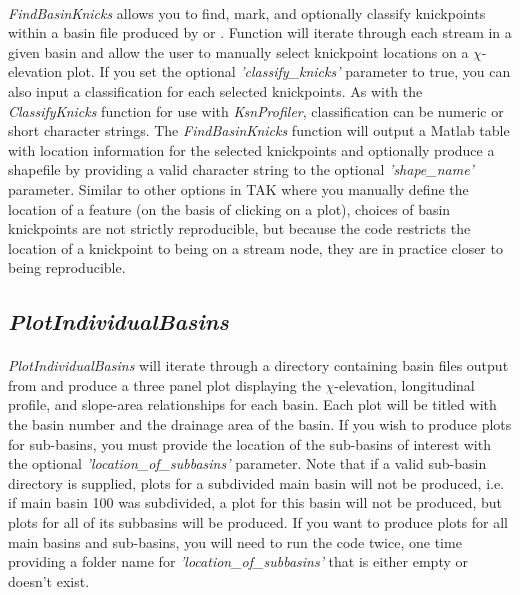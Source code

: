 \paragraph{}\textit{FindBasinKnicks} allows you to find, mark, and optionally classify knickpoints within a basin file produced by  or . Function will iterate through each stream in a given basin and allow the user to manually select knickpoint locations on a $\chi$-elevation plot. If you set the optional \textit{'classify\_knicks'} parameter to true, you can also input a classification for each selected knickpoints. As with the \textit{ClassifyKnicks} function for use with \textit{KsnProfiler}, classification can be numeric or short character strings. The \textit{FindBasinKnicks} function will output a Matlab table with location information for the selected knickpoints and optionally produce a shapefile by providing a valid character string to the optional \textit{'shape\_name'} parameter. Similar to other options in TAK where you manually define the location of a feature (on the basis of clicking on a plot), choices of basin knickpoints are not strictly reproducible, but because the code restricts the location of a knickpoint to being on a stream node, they are in practice closer to being reproducible.

\subsection{\textit{PlotIndividualBasins}}
\paragraph{}\textit{PlotIndividualBasins} will iterate through a directory containing basin files output from  and produce a three panel plot displaying the $\chi$-elevation, longitudinal profile, and slope-area relationships for each basin. Each plot will be titled with the basin number and the drainage area of the basin. If you wish to produce plots for sub-basins, you must provide the location of the sub-basins of interest with the optional \textit{'location\_of\_subbasins'} parameter. Note that if a valid sub-basin directory is supplied, plots for a subdivided main basin will not be produced, i.e. if main basin 100 was subdivided, a plot for this basin will not be produced, but plots for all of its subbasins will be produced. If you want to produce plots for all main basins and sub-basins, you will need to run the code twice, one time providing a folder name for \textit{'location\_of\_subbasins'}  that is either empty or doesn't exist.

